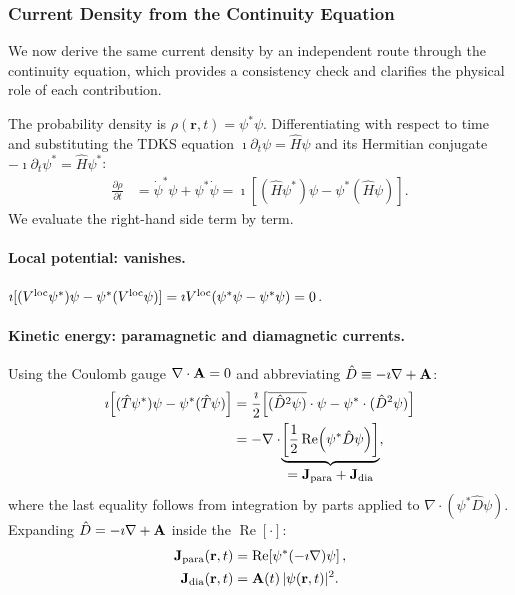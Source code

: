 \subsubsection{Current Density from the Continuity Equation}
\label{sec:current-continuity}

We now derive the same current density by an independent route
through the continuity equation, which provides a consistency check
and clarifies the physical role of each contribution.

The probability density is $\rho(\mathbf{r},t) = \psi^*\psi$.
Differentiating with respect to time and substituting the TDKS
equation $\imath\partial_t\psi = \hat{H}\psi$ and its Hermitian
conjugate $-\imath\partial_t\psi^* = \hat{H}\psi^*$:
\begin{align}
  \frac{\partial\rho}{\partial t}
  &= \dot\psi^*\psi + \psi^*\dot\psi
   = \imath\!\left[(\hat{H}\psi^*)\psi
                  - \psi^*(\hat{H}\psi)\right].
  \label{eq:drho-H}
\end{align}
We evaluate the right-hand side term by term.

\paragraph{Local potential: vanishes.}
$\imath[(V^{\mathrm{loc}}\psi^*)\psi - \psi^*(V^{\mathrm{loc}}\psi)]
= \imath V^{\mathrm{loc}}(\psi^*\psi - \psi^*\psi) = 0$.

\paragraph{Kinetic energy: paramagnetic and diamagnetic currents.}
Using the Coulomb gauge $\nabla\cdot\mathbf{A} = 0$ and abbreviating
$\hat{D} \equiv -\imath\nabla + \mathbf{A}$:
\begin{align}
  \imath\!\left[(\hat{T}\psi^*)\psi - \psi^*(\hat{T}\psi)\right]
  &= \frac{\imath}{2}\!\left[
     \overline{(\hat{D}^2\psi)}\cdot\psi
     - \psi^*\cdot(\hat{D}^2\psi)
     \right]
  \nonumber \\
  &= -\nabla\cdot\!\underbrace{\left[
     \frac{1}{2}\operatorname{Re}\!\left(
     \psi^*\hat{D}\psi\right)\right]}_{\displaystyle
     = \mathbf{J}_{\mathrm{para}} + \mathbf{J}_{\mathrm{dia}}},
  \label{eq:kin-continuity}
\end{align}
where the last equality follows from integration by parts applied
to $\nabla\cdot(\psi^*\hat{D}\psi)$.
Expanding $\hat{D} = -\imath\nabla + \mathbf{A}$ inside the
$\operatorname{Re}[\cdot]$:
\begin{align}
  \mathbf{J}_{\mathrm{para}}(\mathbf{r},t)
  &= \operatorname{Re}\!\left[\psi^*(-\imath\nabla)\psi\right],
  \label{eq:Jpara-def}
  \\
  \mathbf{J}_{\mathrm{dia}}(\mathbf{r},t)
  &= \mathbf{A}(t)\,|\psi(\mathbf{r},t)|^2.
  \label{eq:Jdia-def}
\end{align}


